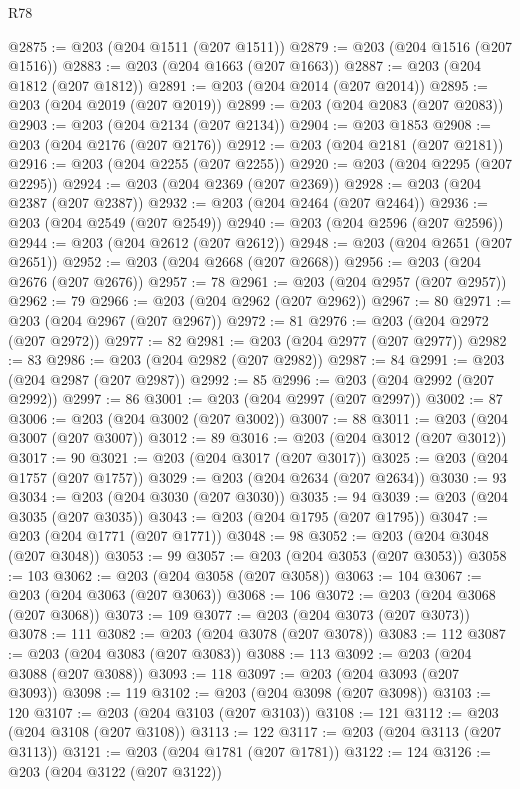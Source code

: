 \begin{lexlean}{R78}
\begin{coremodule}
@2875 := @203 (@204 @1511 (@207 @1511))
@2879 := @203 (@204 @1516 (@207 @1516))
@2883 := @203 (@204 @1663 (@207 @1663))
@2887 := @203 (@204 @1812 (@207 @1812))
@2891 := @203 (@204 @2014 (@207 @2014))
@2895 := @203 (@204 @2019 (@207 @2019))
@2899 := @203 (@204 @2083 (@207 @2083))
@2903 := @203 (@204 @2134 (@207 @2134))
@2904 := @203 @1853
@2908 := @203 (@204 @2176 (@207 @2176))
@2912 := @203 (@204 @2181 (@207 @2181))
@2916 := @203 (@204 @2255 (@207 @2255))
@2920 := @203 (@204 @2295 (@207 @2295))
@2924 := @203 (@204 @2369 (@207 @2369))
@2928 := @203 (@204 @2387 (@207 @2387))
@2932 := @203 (@204 @2464 (@207 @2464))
@2936 := @203 (@204 @2549 (@207 @2549))
@2940 := @203 (@204 @2596 (@207 @2596))
@2944 := @203 (@204 @2612 (@207 @2612))
@2948 := @203 (@204 @2651 (@207 @2651))
@2952 := @203 (@204 @2668 (@207 @2668))
@2956 := @203 (@204 @2676 (@207 @2676))
@2957 := 78
@2961 := @203 (@204 @2957 (@207 @2957))
@2962 := 79
@2966 := @203 (@204 @2962 (@207 @2962))
@2967 := 80
@2971 := @203 (@204 @2967 (@207 @2967))
@2972 := 81
@2976 := @203 (@204 @2972 (@207 @2972))
@2977 := 82
@2981 := @203 (@204 @2977 (@207 @2977))
@2982 := 83
@2986 := @203 (@204 @2982 (@207 @2982))
@2987 := 84
@2991 := @203 (@204 @2987 (@207 @2987))
@2992 := 85
@2996 := @203 (@204 @2992 (@207 @2992))
@2997 := 86
@3001 := @203 (@204 @2997 (@207 @2997))
@3002 := 87
@3006 := @203 (@204 @3002 (@207 @3002))
@3007 := 88
@3011 := @203 (@204 @3007 (@207 @3007))
@3012 := 89
@3016 := @203 (@204 @3012 (@207 @3012))
@3017 := 90
@3021 := @203 (@204 @3017 (@207 @3017))
@3025 := @203 (@204 @1757 (@207 @1757))
@3029 := @203 (@204 @2634 (@207 @2634))
@3030 := 93
@3034 := @203 (@204 @3030 (@207 @3030))
@3035 := 94
@3039 := @203 (@204 @3035 (@207 @3035))
@3043 := @203 (@204 @1795 (@207 @1795))
@3047 := @203 (@204 @1771 (@207 @1771))
@3048 := 98
@3052 := @203 (@204 @3048 (@207 @3048))
@3053 := 99
@3057 := @203 (@204 @3053 (@207 @3053))
@3058 := 103
@3062 := @203 (@204 @3058 (@207 @3058))
@3063 := 104
@3067 := @203 (@204 @3063 (@207 @3063))
@3068 := 106
@3072 := @203 (@204 @3068 (@207 @3068))
@3073 := 109
@3077 := @203 (@204 @3073 (@207 @3073))
@3078 := 111
@3082 := @203 (@204 @3078 (@207 @3078))
@3083 := 112
@3087 := @203 (@204 @3083 (@207 @3083))
@3088 := 113
@3092 := @203 (@204 @3088 (@207 @3088))
@3093 := 118
@3097 := @203 (@204 @3093 (@207 @3093))
@3098 := 119
@3102 := @203 (@204 @3098 (@207 @3098))
@3103 := 120
@3107 := @203 (@204 @3103 (@207 @3103))
@3108 := 121
@3112 := @203 (@204 @3108 (@207 @3108))
@3113 := 122
@3117 := @203 (@204 @3113 (@207 @3113))
@3121 := @203 (@204 @1781 (@207 @1781))
@3122 := 124
@3126 := @203 (@204 @3122 (@207 @3122))

\end{coremodule}
\end{lexlean}
